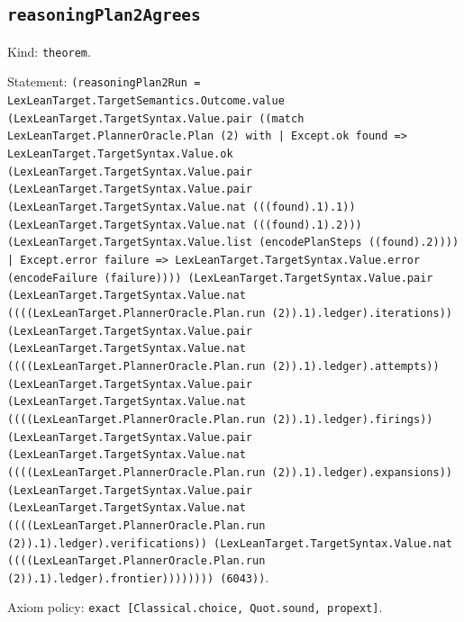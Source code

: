 \documentclass[11pt]{article}
\begin{document}
\subsection*{\texttt{reasoningPlan2Agrees}}
\noindent Kind: \texttt{theorem}.\par
\noindent Statement: \texttt{(reasoningPlan2Run = LexLeanTarget.TargetSemantics.Outcome.value (LexLeanTarget.TargetSyntax.Value.pair ((match LexLeanTarget.PlannerOracle.Plan (2) with | Except.ok found => LexLeanTarget.TargetSyntax.Value.ok (LexLeanTarget.TargetSyntax.Value.pair (LexLeanTarget.TargetSyntax.Value.pair (LexLeanTarget.TargetSyntax.Value.nat (((found).1).1)) (LexLeanTarget.TargetSyntax.Value.nat (((found).1).2))) (LexLeanTarget.TargetSyntax.Value.list (encodePlanSteps ((found).2)))) | Except.error failure => LexLeanTarget.TargetSyntax.Value.error (encodeFailure (failure)))) (LexLeanTarget.TargetSyntax.Value.pair (LexLeanTarget.TargetSyntax.Value.nat ((((LexLeanTarget.PlannerOracle.Plan.run (2)).1).ledger).iterations)) (LexLeanTarget.TargetSyntax.Value.pair (LexLeanTarget.TargetSyntax.Value.nat ((((LexLeanTarget.PlannerOracle.Plan.run (2)).1).ledger).attempts)) (LexLeanTarget.TargetSyntax.Value.pair (LexLeanTarget.TargetSyntax.Value.nat ((((LexLeanTarget.PlannerOracle.Plan.run (2)).1).ledger).firings)) (LexLeanTarget.TargetSyntax.Value.pair (LexLeanTarget.TargetSyntax.Value.nat ((((LexLeanTarget.PlannerOracle.Plan.run (2)).1).ledger).expansions)) (LexLeanTarget.TargetSyntax.Value.pair (LexLeanTarget.TargetSyntax.Value.nat ((((LexLeanTarget.PlannerOracle.Plan.run (2)).1).ledger).verifications)) (LexLeanTarget.TargetSyntax.Value.nat ((((LexLeanTarget.PlannerOracle.Plan.run (2)).1).ledger).frontier)))))))) (6043))}.\par
\noindent Axiom policy: \texttt{exact [Classical.choice, Quot.sound, propext]}.\par
\end{document}
